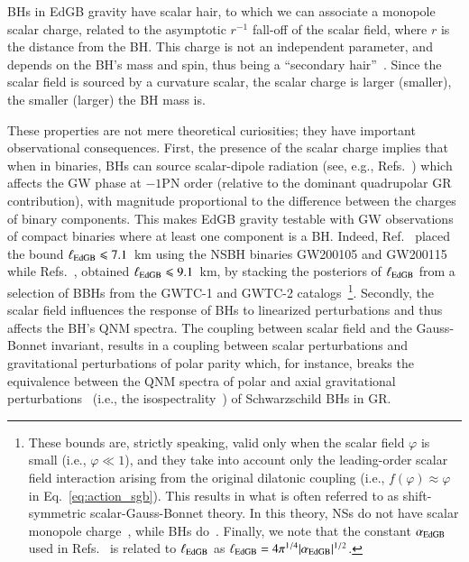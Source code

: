 \documentclass[twocolumn,
               prd,
               aps,
               superscriptaddress,
               tightenlines,
               nofootinbib,
               eqsecnum,
               amsfonts,
               amsmath,
               longbibliography]{revtex4-1}
\begin{document}
BHs in EdGB gravity have scalar hair, to which we can associate a monopole scalar charge,
related to the asymptotic $r^{-1}$ fall-off of the scalar field, where $r$ is the distance from the BH.
%
This charge is not an independent parameter, and depends on the BH's mass and spin,
thus being a ``secondary hair''~\cite{Coleman:1991ku,Kanti:1995vq,Herdeiro:2015waa}.
%
Since the scalar field is sourced by a curvature scalar, the scalar charge is larger (smaller),
the smaller (larger) the BH mass is.

These properties are not mere theoretical curiosities; they have important observational consequences.
%
First, the presence of the scalar charge implies that when in binaries, BHs can source
scalar-dipole radiation (see, e.g., Refs.~\cite{Yagi:2011xp,Julie:2019sab,Shiralilou:2020gah,Shiralilou:2021mfl,Julie:2022huo})
which affects the GW phase at $-1$PN order (relative to the dominant quadrupolar GR
contribution), with magnitude proportional to the difference between the
charges of binary components. This makes EdGB gravity testable with GW
observations of compact binaries where at least one component is a BH.
%
Indeed, Ref.~\cite{Lyu:2022gdr} placed the bound
%
$\ell_{\rm EdGB} \leqslant 7.1$~km
%
using the NSBH binaries GW200105 and
GW200115~\cite{LIGOScientific:2021qlt} while Refs.~\cite{Nair:2019iur,Perkins:2021mhb}, obtained
%
$\ell_{\rm EdGB} \leqslant 9.1$~km,
%
by stacking the posteriors of $\ell_{\rm EdGB}$ from a selection of BBHs
from the GWTC-1 and GWTC-2 catalogs~\cite{LIGOScientific:2018mvr,LIGOScientific:2020ibl}\footnote{These bounds
are, strictly speaking, valid only when the scalar field $\varphi$ is small (i.e., $\varphi \ll 1$), and
they take into account only the leading-order scalar field interaction arising from the original dilatonic coupling 
(i.e., $f(\varphi) \approx \varphi$ in Eq.~\eqref{eq:action_sgb}).
This results in what is often referred to as shift-symmetric scalar-Gauss-Bonnet theory.
In this theory, NSs do not have scalar monopole charge~\cite{Yagi:2015oca}, while BHs do~\cite{Yunes:2011we,Sotiriou:2013qea,Sotiriou:2014pfa}. Finally, we note that the constant $\alpha_{\rm EdGB}$ used in Refs.~\cite{Yagi:2011xp,Nair:2019iur,Perkins:2021mhb,Lyu:2022gdr} is related to $\ell_{\rm EdGB}$ as $\ell_{\rm EdGB} = 4 \pi^{1/4} |\alpha_{\rm EdGB}|^{1/2}$.}.
Secondly, the scalar field influences the response of BHs to linearized perturbations and thus
affects the BH's QNM spectra.
%
The coupling between scalar field and the Gauss-Bonnet invariant,
results in a coupling between scalar perturbations and gravitational
perturbations of polar parity which, for instance, breaks the equivalence
between the QNM spectra of polar and axial gravitational perturbations~\cite{Glampedakis:2017rar,Lenzi:2021njy}
(i.e., the isospectrality~\cite{Chandrasekhar:1985kt}) of Schwarzschild BHs in GR.
\end{document}
